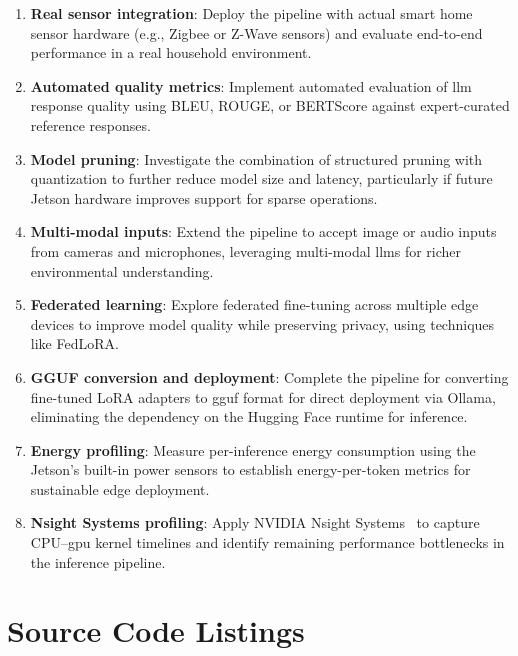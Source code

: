 \documentclass[12pt,a4paper,oneside]{report}
\begin{document}
\begin{enumerate}
    \item \textbf{Real sensor integration}: Deploy the pipeline with actual smart home sensor hardware (e.g., Zigbee or Z-Wave sensors) and evaluate end-to-end performance in a real household environment.

    \item \textbf{Automated quality metrics}: Implement automated evaluation of \gls{llm} response quality using BLEU, ROUGE, or BERTScore against expert-curated reference responses.

    \item \textbf{Model pruning}: Investigate the combination of structured pruning with quantization to further reduce model size and latency, particularly if future Jetson hardware improves support for sparse operations.

    \item \textbf{Multi-modal inputs}: Extend the pipeline to accept image or audio inputs from cameras and microphones, leveraging multi-modal \glspl{llm} for richer environmental understanding.

    \item \textbf{Federated learning}: Explore federated fine-tuning across multiple edge devices to improve model quality while preserving privacy, using techniques like FedLoRA.

    \item \textbf{GGUF conversion and deployment}: Complete the pipeline for converting fine-tuned LoRA adapters to \gls{gguf} format for direct deployment via Ollama, eliminating the dependency on the Hugging Face runtime for inference.

    \item \textbf{Energy profiling}: Measure per-inference energy consumption using the Jetson's built-in power sensors to establish energy-per-token metrics for sustainable edge deployment.

    \item \textbf{Nsight Systems profiling}: Apply NVIDIA Nsight Systems~\cite{nvidia2024nsight} to capture CPU--\gls{gpu} kernel timelines and identify remaining performance bottlenecks in the inference pipeline.
\end{enumerate}


\appendix
\chapter{Source Code Listings}
\label{app:code}

\end{document}
